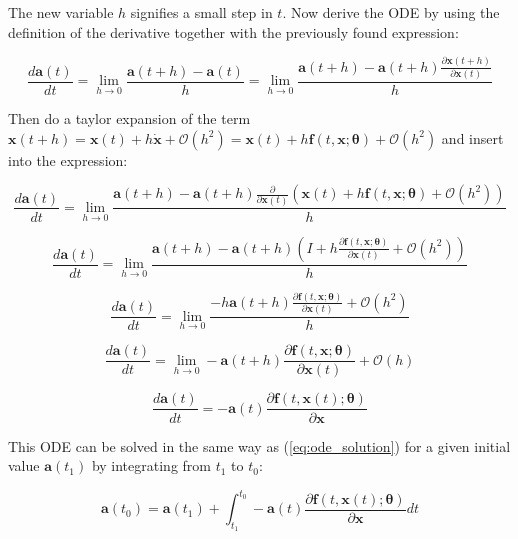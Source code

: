 \documentclass[12pt,a4paper]{book}
\begin{document}
The new variable $h$ signifies a small step in $t$. Now derive the ODE by using the definition of the derivative together with the previously found expression:

\begin{equation*}
    \frac{d \bm{a}(t)}{d t} = \lim_{h \rightarrow 0} \frac{\bm{a}(t + h) - \bm{a}(t)}{h}
    = \lim_{h \rightarrow 0} \frac{\bm{a}(t + h) - \bm{a}(t+h) \frac{\partial \bm{x}(t+h)}{\partial \bm{x}(t)}}{h}
\end{equation*}

Then do a taylor expansion of the term $\bm{x}(t+h) = \bm{x}(t) + h \dot{\bm{x}} + \mathcal{O}(h^2) = \bm{x}(t) + h \bm{f}(t, \bm{x}; \bm{\theta}) + \mathcal{O}(h^2)$ and insert into the expression:

\begin{equation*}
    \frac{d \bm{a}(t)}{d t} = \lim_{h \rightarrow 0} \frac{\bm{a}(t + h) - \bm{a}(t+h) \frac{\partial}{\partial \bm{x}(t)}(\bm{x}(t) + h \bm{f}(t, \bm{x}; \bm{\theta}) + \mathcal{O}(h^2))}{h}
\end{equation*}

\begin{equation*}
    \frac{d \bm{a}(t)}{d t} = \lim_{h \rightarrow 0} \frac{\bm{a}(t + h) - \bm{a}(t+h) (I + h \frac{\partial \bm{f}(t, \bm{x}; \bm{\theta})}{\partial \bm{x}(t)} + \mathcal{O}(h^2))}{h}
\end{equation*}

\begin{equation*}
    \frac{d \bm{a}(t)}{d t} = \lim_{h \rightarrow 0} \frac{- h \bm{a}(t+h) \frac{\partial \bm{f}(t, \bm{x}; \bm{\theta})}{\partial \bm{x}(t)} + \mathcal{O}(h^2)}{h}
\end{equation*}

\begin{equation*}
    \frac{d \bm{a}(t)}{d t} = \lim_{h \rightarrow 0} - \bm{a}(t+h) \frac{\partial \bm{f}(t, \bm{x}; \bm{\theta})}{\partial \bm{x}(t)} + \mathcal{O}(h)
\end{equation*}

\begin{equation}
    \frac{d \bm{a}(t)}{d t} = - \bm{a}(t) \frac{\partial \bm{f}(t, \bm{x}(t) ; \bm{\theta})}{\partial \bm{x}}
\label{eq:adjoint_ode}
\end{equation}

This ODE can be solved in the same way as (\ref{eq:ode_solution}) for a given initial value $\bm{a}(t_1)$ by integrating from $t_1$ to $t_0$:

\begin{equation}
    \bm{a}(t_0) = \bm{a}(t_1) + \int_{t_1}^{t_0} - \bm{a}(t) \frac{\partial \bm{f}(t, \bm{x}(t) ; \bm{\theta})}{\partial \bm{x}} dt
\label{eq:adjoint_ode_solution}
\end{equation}
\end{document}
